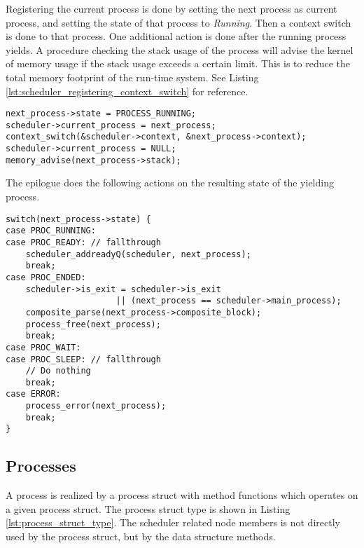 Registering the current process is done by setting the next process as current process, and setting the state of that process to \textit{Running}. Then a context switch is done to that process. One additional action is done after the running process yields. A procedure checking the stack usage of the process will advise the kernel of memory usage if the stack usage exceeds a certain limit. This is to reduce the total memory footprint of the run\hyp{}time system. See Listing \ref{lst:scheduler_registering_context_switch} for reference.

\begin{lstlisting}[style={CustomC},caption={Scheduler registering and context switch to running process},label={lst:scheduler_registering_context_switch}]
next_process->state = PROCESS_RUNNING;
scheduler->current_process = next_process;
context_switch(&scheduler->context, &next_process->context);
scheduler->current_process = NULL;
memory_advise(next_process->stack);
\end{lstlisting}

The epilogue does the following actions on the resulting state of the yielding process. 

\begin{lstlisting}[style={CustomC},caption={Handling of process state in epilogue},label={lst:process_state_epilogue}]
switch(next_process->state) {
case PROC_RUNNING:
case PROC_READY: // fallthrough
    scheduler_addreadyQ(scheduler, next_process);
    break;
case PROC_ENDED:
    scheduler->is_exit = scheduler->is_exit 
                      || (next_process == scheduler->main_process);
    composite_parse(next_process->composite_block);
    process_free(next_process);
    break;
case PROC_WAIT:
case PROC_SLEEP: // fallthrough
    // Do nothing
    break;
case ERROR:
    process_error(next_process);
    break;
}
\end{lstlisting}

\subsection{Processes}

A process is realized by a process struct with method functions which operates on a given process struct. The process struct type is shown in Listing \ref{lst:process_struct_type}. The scheduler related node members is not directly used by the process struct, but by the data structure methods.

